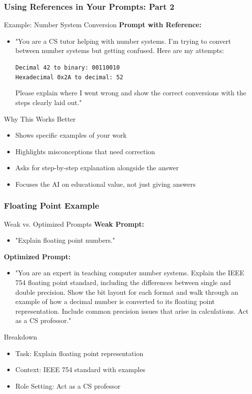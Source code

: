 \documentclass{beamer}
\begin{document}
\begin{frame}
\frametitle{Using References in Your Prompts: Part 2}
\begin{block}{Example: Number System Conversion}
\textbf{Prompt with Reference:}
\begin{itemize}
\item "You are a CS tutor helping with number systems. I'm trying to convert between number systems but getting confused. Here are my attempts:

\texttt{Decimal 42 to binary: 00110010}\\
\texttt{Hexadecimal 0x2A to decimal: 52}

Please explain where I went wrong and show the correct conversions with the steps clearly laid out."
\end{itemize}
\end{block}

\begin{alertblock}{Why This Works Better}
\begin{itemize}
\item Shows specific examples of your work
\item Highlights misconceptions that need correction
\item Asks for step-by-step explanation alongside the answer
\item Focuses the AI on educational value, not just giving answers
\end{itemize}
\end{alertblock}
\end{frame}
\begin{frame}
\frametitle{Floating Point Example}
\begin{block}{Weak vs. Optimized Prompts}
\textbf{Weak Prompt:} 
\begin{itemize}
\item "Explain floating point numbers."
\end{itemize}

\textbf{Optimized Prompt:}
\begin{itemize}
\item "You are an expert in teaching computer number systems. Explain the IEEE 754 floating point standard, including the differences between single and double precision. Show the bit layout for each format and walk through an example of how a decimal number is converted to its floating point representation. Include common precision issues that arise in calculations. Act as a CS professor."
\end{itemize}
\end{block}

\begin{alertblock}{Breakdown}
\begin{itemize}
\item Task: Explain floating point representation
\item Context: IEEE 754 standard with examples
\item Role Setting: Act as a CS professor
\end{itemize}
\end{alertblock}
\end{frame}
\end{document}
